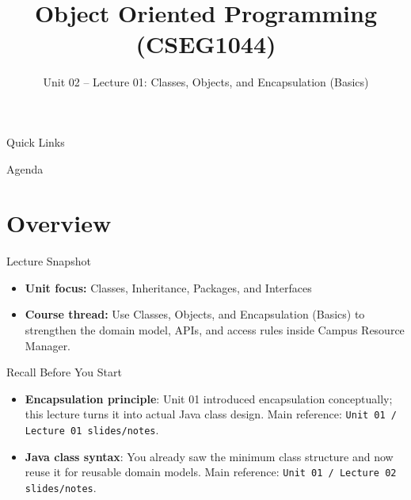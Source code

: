 \documentclass{beamer}
\title[OOPS with Java]{Object Oriented Programming (CSEG1044)}
\subtitle{Unit 02 -- Lecture 01: Classes, Objects, and Encapsulation (Basics)}
\begin{document}
\begin{frame}[fragile]
  \titlepage
  \vspace{0.5em}
  \slidesources{\OOPSUnitIISources}
\end{frame}

\begin{frame}{Quick Links}
  \centering
  \hyperlink{sec:overview}{}\hspace{0.6em}
  \hyperlink{sec:concepts}{}\hspace{0.6em}
  \hyperlink{sec:demo}{}\hspace{0.6em}
  \hyperlink{sec:summary}{}
  \slidesources{\OOPSUnitIISources}
\end{frame}

\begin{frame}{Agenda}
  \tableofcontents
  \slidesources{\OOPSUnitIISources}
\end{frame}

\section{Overview}
\label{sec:overview}

\begin{frame}{Lecture Snapshot}
\begin{itemize}[<+->]
  \item \textbf{Unit focus:} Classes, Inheritance, Packages, and Interfaces
  \item \textbf{Course thread:} Use Classes, Objects, and Encapsulation (Basics) to strengthen the domain model, APIs, and access rules inside Campus Resource Manager.
\end{itemize}
  \slidesources{\OOPSUnitIISources}
\end{frame}

\begin{frame}{Recall Before You Start}
\begin{itemize}[<+->]
  \item \textbf{Encapsulation principle}: Unit 01 introduced encapsulation conceptually; this lecture turns it into actual Java class design. Main reference: \texttt{Unit 01 / Lecture 01 slides/notes}.
  \item \textbf{Java class syntax}: You already saw the minimum class structure and now reuse it for reusable domain models. Main reference: \texttt{Unit 01 / Lecture 02 slides/notes}.
\end{itemize}
  \slidesources{\OOPSUnitIISources}
\end{frame}
\end{document}
